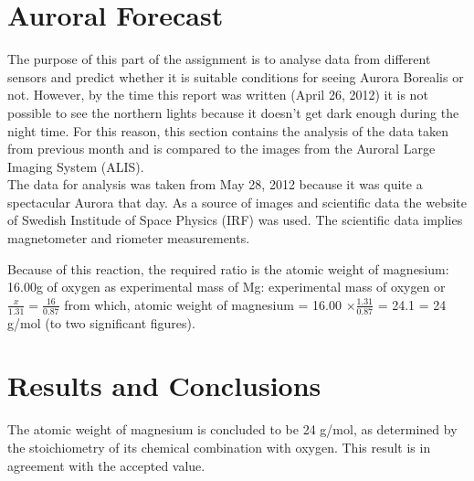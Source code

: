 \documentclass{article}
\begin{document}

\section{Auroral Forecast}

The purpose of this part of the assignment is to analyse data from different sensors and predict whether it is suitable conditions for seeing Aurora Borealis or not. However, by the time this report was written (April 26, 2012) it is not possible to see the northern lights because it doesn't get dark enough during the night time. For this reason, this section contains the analysis of the data taken from previous month and is compared to the images from the Auroral Large Imaging System (ALIS).
\\
The data for analysis was taken from May 28, 2012 because it was quite a spectacular Aurora that day. As a source of images and scientific data the website of Swedish Institude of Space Physics (IRF) was used. The scientific data implies magnetometer and riometer measurements.


Because of this reaction, the required ratio is the atomic weight of magnesium: 16.00g of oxygen as experimental mass of Mg: experimental mass of oxygen or $\frac{x}{1.31}=\frac{16}{0.87}$ from which, atomic weight of magnesium = 16.00 $\times \frac{1.31}{0.87}$ = 24.1 = 24 g/mol (to two significant figures).


\section{Results and Conclusions}

The atomic weight of magnesium is concluded to be 24 g/mol, as determined by the stoichiometry of its chemical combination with oxygen. This result is in agreement with the accepted value.

\end{document}
